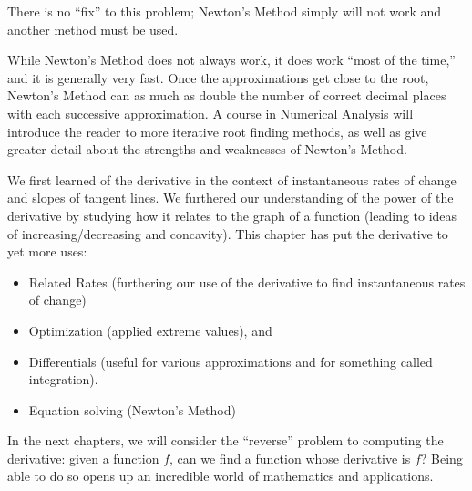 There is no ``fix'' to this problem; Newton's Method simply will not work and another method must be used.


While Newton's Method does not always work, it does work ``most of the time,'' and it is generally very fast. Once the approximations get close to the root, Newton's Method can as much as double the number of correct decimal places with each successive approximation. A course in Numerical Analysis will introduce the reader to more iterative root finding methods, as well as give greater detail about the strengths and weaknesses of Newton's Method.\bigskip


We first learned of the derivative in the context of instantaneous rates of change and slopes of tangent lines. We furthered our understanding of the power of the derivative by studying how it relates to the graph of a function (leading to ideas of increasing/decreasing and concavity). This chapter has put the derivative to yet more uses:
\begin{itemize}
\item	Related Rates (furthering our use of the derivative to find instantaneous rates of change)
\item	Optimization (applied extreme values), and
\item	Differentials (useful for various approximations and for something called integration).
\item Equation solving (Newton's Method)
\end{itemize}

In the next chapters, we will consider the ``reverse'' problem to computing the derivative: given a function $f$, can we find a function whose derivative is $f$\primeskip? Being able to do so opens up an incredible world of mathematics and applications.


